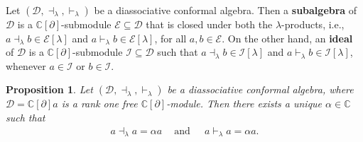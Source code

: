 \documentclass[a4paper,reqno,10pt]{amsart}
\theoremstyle{plain}
\newtheorem{proposition}[thm]{Proposition}
\theoremstyle{definition}
\theoremstyle{remark}
\newcommand{\C}{\mathbb{C}}
\newcommand{\D}{\mathcal{D}}
\newcommand{\E}{\mathcal{E}}
\newcommand{\p}{\partial}
\newcommand{\la}{\lambda}
\begin{document}
\medskip

Let $(\D,\dashv_{\la},\vdash_{\la})$ be a diassociative conformal algebra. Then a {\bf subalgebra} of $\D$ is a $\C[\p]$-submodule $\E\subseteq\D$ that is closed under both the $\la$-products, i.e., $a\dashv_{\la}b \in\E[\la]$ and $a\vdash_{\la}b\in\E[\la]$, for all $a,b\in\E$. On the other hand, an {\bf ideal} of $\D$ is a $\C[\p]$-submodule $\mathcal{I} \subseteq \D$ such that $a\dashv_{\la}b \in \mathcal{I} [\la]$ and $ a\vdash_{\la}b \in\mathcal{I}[\la]$, whenever $a \in \mathcal{I}$ or $b \in \mathcal{I}$.


\begin{proposition}
Let $(\mathcal{D}, \dashv_\la, \vdash_\la)$ be a diassociative conformal algebra, where $\mathcal{D}=\mathbb{C}[\partial]a$ is a rank one free $\mathbb{C}[\partial]$-module. Then there exists a unique $\alpha \in \mathbb{C}$ such that
\begin{align*}
a\dashv_{\la}a=\alpha a
~~~~\text{ and }~~~~~
a\vdash_{\la}a=\alpha a.
\end{align*}
\end{proposition}
\end{document}
